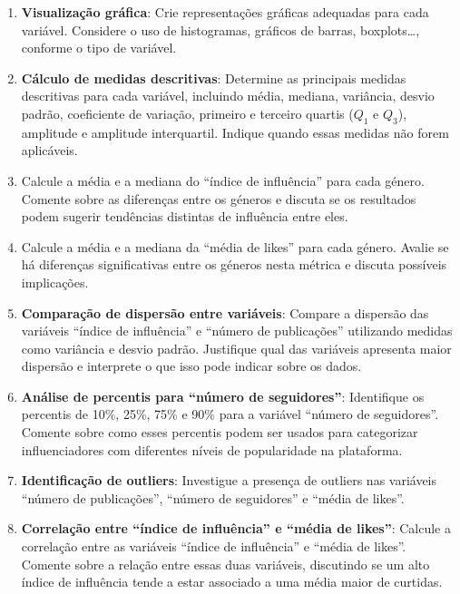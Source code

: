 \documentclass[
]{book}
\newenvironment{Shaded}{\begin{snugshade}}{\end{snugshade}}
\newcommand{\CommentTok}[1]{\textcolor[rgb]{0.56,0.35,0.01}{\textit{#1}}}
\newcommand{\FunctionTok}[1]{\textcolor[rgb]{0.13,0.29,0.53}{\textbf{#1}}}
\newcommand{\NormalTok}[1]{#1}
\newcommand{\OtherTok}[1]{\textcolor[rgb]{0.56,0.35,0.01}{#1}}
\newcommand{\SpecialCharTok}[1]{\textcolor[rgb]{0.81,0.36,0.00}{\textbf{#1}}}
\begin{document}
\begin{Shaded}
\end{Shaded}

\begin{enumerate}
\def\labelenumi{(\alph{enumi})}
\setcounter{enumi}{2}
\item
  \textbf{Visualização gráfica}: Crie representações gráficas adequadas para cada variável. Considere o uso de histogramas, gráficos de barras, boxplots\ldots, conforme o tipo de variável.
\item
  \textbf{Cálculo de medidas descritivas}: Determine as principais medidas descritivas para cada variável, incluindo média, mediana, variância, desvio padrão, coeficiente de variação, primeiro e terceiro quartis (\(Q_1\) e \(Q_3\)), amplitude e amplitude interquartil. Indique quando essas medidas não forem aplicáveis.
\item
  Calcule a média e a mediana do ``índice de influência'' para cada género. Comente sobre as diferenças entre os géneros e discuta se os resultados podem sugerir tendências distintas de influência entre eles.
\item
  Calcule a média e a mediana da ``média de likes'' para cada género. Avalie se há diferenças significativas entre os géneros nesta métrica e discuta possíveis implicações.
\item
  \textbf{Comparação de dispersão entre variáveis}: Compare a dispersão das variáveis ``índice de influência'' e ``número de publicações'' utilizando medidas como variância e desvio padrão. Justifique qual das variáveis apresenta maior dispersão e interprete o que isso pode indicar sobre os dados.
\item
  \textbf{Análise de percentis para ``número de seguidores''}: Identifique os percentis de 10\%, 25\%, 75\% e 90\% para a variável ``número de seguidores''. Comente sobre como esses percentis podem ser usados para categorizar influenciadores com diferentes níveis de popularidade na plataforma.
\item
  \textbf{Identificação de outliers}: Investigue a presença de outliers nas variáveis ``número de publicações'', ``número de seguidores'' e ``média de likes''.
\item
  \textbf{Correlação entre ``índice de influência'' e ``média de likes''}: Calcule a correlação entre as variáveis ``índice de influência'' e ``média de likes''. Comente sobre a relação entre essas duas variáveis, discutindo se um alto índice de influência tende a estar associado a uma média maior de curtidas.
\end{enumerate}
\end{document}
